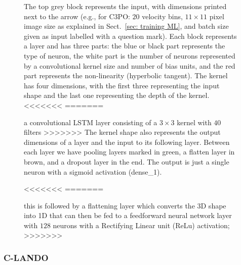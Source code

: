 \documentclass{aa}
\begin{document}
{{\begin{figure}[!t]
{    The top grey block represents the input, with dimensions printed next to the arrow (e.g., for C3PO: $20$ velocity bins, $11\times11$ pixel image size as explained in Sect.~\ref{sec: training ML}, and batch size given as input labelled with a question mark).
    Each block represents a layer and has three parts: the blue or black part represents the type of neuron, the white part is the number of neurons represented by a convolutional kernel size and number of bias units, and the red part represents the non-linearity (hyperbolic tangent).
    The kernel has four dimensions, with the first three representing the input shape and the last one representing the depth of the kernel.
<<<<<<<
=======
    \item a convolutional LSTM layer consisting of a $3\times3$ kernel with $40$ filters 
>>>>>>>
    The kernel shape also represents the output dimensions of a layer and the input to its following layer. %
    Between each layer we have pooling layers marked in green, a flatten layer in brown, and a dropout layer in the end. 
    The output is just a single neuron with a sigmoid activation (dense\_1).}
    \label{fig:c3po schematic}
<<<<<<<
=======
    \item  this is followed by a flattening layer which converts the 3D shape into 1D that can then be fed to a feedforward neural network layer  with $128$ neurons with a Rectifying Linear unit (ReLu) activation;
>>>>>>>
\end{figure}

\subsubsection{C-LANDO}

}}
\end{document}
